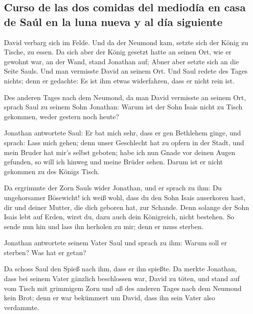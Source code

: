 \hypertarget{curso-de-las-dos-comidas-del-medioduxeda-en-casa-de-sauxfal-en-la-luna-nueva-y-al-duxeda-siguiente}{%
\subsection{Curso de las dos comidas del mediodía en casa de Saúl en la
luna nueva y al día
siguiente}\label{curso-de-las-dos-comidas-del-medioduxeda-en-casa-de-sauxfal-en-la-luna-nueva-y-al-duxeda-siguiente}}

 David verbarg sich im Felde. Und da der Neumond kam,
setzte sich der König zu Tische, zu essen.  Da sich aber
der König gesetzt hatte an seinen Ort, wie er gewohnt war, an der Wand,
stand Jonathan auf; Abner aber setzte sich an die Seite Sauls. Und man
vermisste David an seinem Ort.  Und Saul redete des Tages
nichts; denn er gedachte: Es ist ihm etwas widerfahren, dass er nicht
rein ist.

 Des anderen Tages nach dem Neumond, da man David
vermisste an seinem Ort, sprach Saul zu seinem Sohn Jonathan: Warum ist
der Sohn Isais nicht zu Tisch gekommen, weder gestern noch heute?

 Jonathan antwortete Saul: Er bat mich sehr, dass er gen
Bethlehem ginge,  und sprach: Lass mich gehen; denn unser
Geschlecht hat zu opfern in der Stadt, und mein Bruder hat mir's selbst
geboten; habe ich nun Gnade vor deinen Augen gefunden, so will ich
hinweg und meine Brüder sehen. Darum ist er nicht gekommen zu des Königs
Tisch.

 Da ergrimmte der Zorn Sauls wider Jonathan, und er
sprach zu ihm: Du ungehorsamer Bösewicht! ich weiß wohl, dass du den
Sohn Isais auserkoren hast, dir und deiner Mutter, die dich geboren hat,
zur Schande.  Denn solange der Sohn Isais lebt auf Erden,
wirst du, dazu auch dein Königreich, nicht bestehen. So sende nun hin
und lass ihn herholen zu mir; denn er muss sterben.

 Jonathan antwortete seinem Vater Saul und sprach zu ihm:
Warum soll er sterben? Was hat er getan?

 Da schoss Saul den Spieß nach ihm, dass er ihn spießte.
Da merkte Jonathan, dass bei seinem Vater gänzlich beschlossen war,
David zu töten,  und stand auf vom Tisch mit grimmigem
Zorn und aß des anderen Tages nach dem Neumond kein Brot; denn er war
bekümmert um David, dass ihn sein Vater also verdammte.

